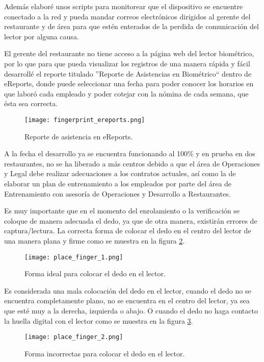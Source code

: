 Además elaboré unos scripts para monitorear que el dispositivo se encuentre conectado a la red y pueda mandar correos electrónicos dirigidos al gerente del restaurante y de área para que estén enterados de la perdida de comunicación del lector por alguna causa.

El gerente del restaurante no tiene acceso a la página web del lector biométrico, por lo que para que pueda visualizar los registros de una manera rápida y fácil desarrollé el reporte titulado ''Reporte de Asistencias en Biométrico`` dentro de eReports, donde puede seleccionar una fecha para poder conocer los horarios en que laboró cada empleado y poder cotejar con la nómina de cada semana, que ésta sea correcta.

 \begin{figure}[htb]
 \begin{center}
  \texttt{[image: fingerprint\_ereports.png]}
 \end{center}
 \caption{Reporte de asistencia en eReports.}
 \label{fig:finger_print_ereports}
\end{figure}

A la fecha el desarrollo ya se encuentra funcionando al 100\% y en prueba en dos restaurantes, no se ha liberado a más centros debido a que el área de Operaciones y Legal debe realizar adecuaciones a los contratos actuales, así como la de elaborar un plan de entrenamiento a los empleados por parte del área de Entrenamiento con asesoría de Operaciones y Desarrollo a Restaurantes.

Es muy importante que en el momento del enrolamiento o la verificación se coloque de manera adecuada el dedo, ya que de otra manera, existirán errores de captura/lectura. La correcta forma de colocar el dedo en el centro del lector de una manera plana y firme como se muestra en la figura \ref{fig:finger_print_10}.

\begin{figure}[htb]
 \begin{center}
  \texttt{[image: place\_finger\_1.png]}
 \end{center}
 \caption{Forma ideal para colocar el dedo en el lector.}
 \label{fig:finger_print_10}
\end{figure}

Es considerada una mala colocación del dedo en el lector, cuando el dedo no se encuentra completamente plano, no se encuentra en el centro del lector, ya sea que esté muy a la derecha, izquierda o abajo. O cuando el dedo no haga contacto la huella digital con el lector como se muestra en la figura \ref{fig:finger_print_11}.

\begin{figure}[htb]
 \begin{center}
  \texttt{[image: place\_finger\_2.png]}
 \end{center}
 \caption{Forma incorrectas para colocar el dedo en el lector.}
 \label{fig:finger_print_11}
\end{figure}